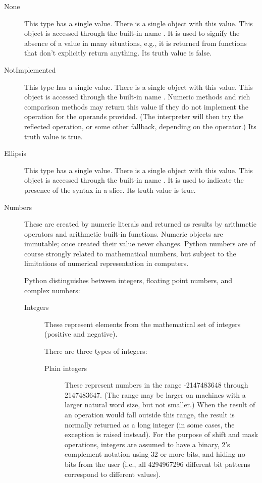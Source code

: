 \begin{description}

\item[None]
This type has a single value.  There is a single object with this value.
This object is accessed through the built-in name .
It is used to signify the absence of a value in many situations, e.g.,
it is returned from functions that don't explicitly return anything.
Its truth value is false.

\item[NotImplemented]
This type has a single value.  There is a single object with this value.
This object is accessed through the built-in name .
Numeric methods and rich comparison methods may return this value if
they do not implement the operation for the operands provided.  (The
interpreter will then try the reflected operation, or some other
fallback, depending on the operator.)  Its truth value is true.

\item[Ellipsis]
This type has a single value.  There is a single object with this value.
This object is accessed through the built-in name .
It is used to indicate the presence of the  syntax in a
slice.  Its truth value is true.

\item[Numbers]
These are created by numeric literals and returned as results by
arithmetic operators and arithmetic built-in functions.  Numeric
objects are immutable; once created their value never changes.  Python
numbers are of course strongly related to mathematical numbers, but
subject to the limitations of numerical representation in computers.

Python distinguishes between integers, floating point numbers, and
complex numbers:

\begin{description}
\item[Integers]
These represent elements from the mathematical set of integers
(positive and negative).

There are three types of integers:

\begin{description}

\item[Plain integers]
These represent numbers in the range -2147483648 through 2147483647.
(The range may be larger on machines with a larger natural word
size, but not smaller.)
When the result of an operation would fall outside this range, the
result is normally returned as a long integer (in some cases, the
exception  is raised instead).
For the purpose of shift and mask operations, integers are assumed to
have a binary, 2's complement notation using 32 or more bits, and
hiding no bits from the user (i.e., all 4294967296 different bit
patterns correspond to different values).


\end{description}
\end{description}
\end{description}
